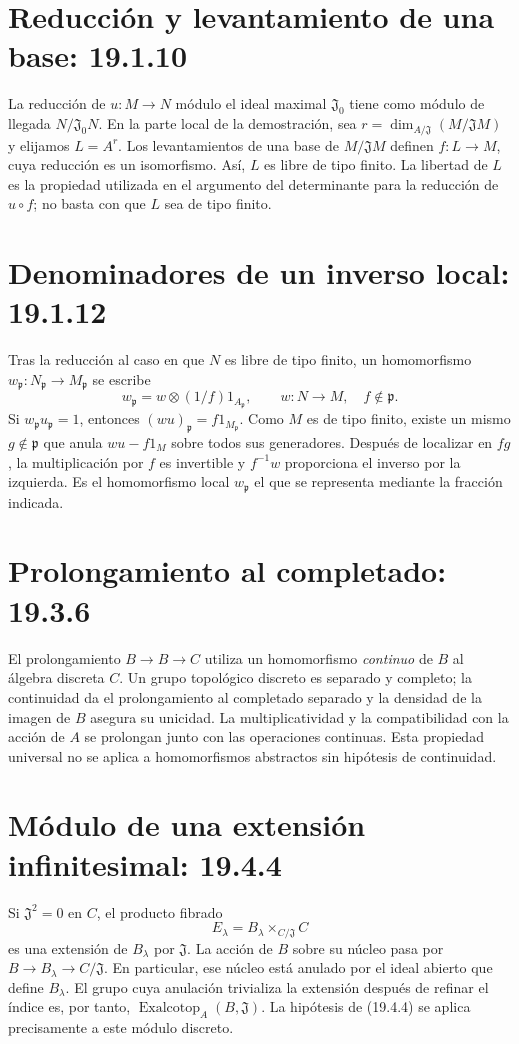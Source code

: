 \documentclass[11pt,a4paper]{article}
\newcommand{\Exalcotop}{\operatorname{Exalcotop}}
\begin{document}
\section*{Reducción y levantamiento de una base: 19.1.10}
La reducción de $u:M\to N$ módulo el ideal maximal $\mathfrak J_0$
tiene como módulo de llegada $N/\mathfrak J_0N$.
En la parte local de la demostración, sea
$r=\dim_{A/\mathfrak J}(M/\mathfrak JM)$ y elijamos $L=A^r$.
Los levantamientos de una base de $M/\mathfrak JM$ definen $f:L\to M$,
cuya reducción es un isomorfismo. Así, $L$ es libre de tipo finito.
La libertad de $L$ es la propiedad utilizada en el argumento del determinante
para la reducción de $u\circ f$; no basta con que $L$ sea de tipo finito.

\section*{Denominadores de un inverso local: 19.1.12}
Tras la reducción al caso en que $N$ es libre de tipo finito, un homomorfismo
$w_{\mathfrak p}:N_{\mathfrak p}\to M_{\mathfrak p}$ se escribe
\[
w_{\mathfrak p}=w\otimes(1/f)1_{A_{\mathfrak p}},
\qquad w:N\to M,\quad f\notin\mathfrak p.
\]
Si $w_{\mathfrak p}u_{\mathfrak p}=1$, entonces
$(wu)_{\mathfrak p}=f1_{M_{\mathfrak p}}$.
Como $M$ es de tipo finito, existe un mismo $g\notin\mathfrak p$ que
anula $wu-f1_M$ sobre todos sus generadores. Después de localizar en $fg$,
la multiplicación por $f$ es invertible y $f^{-1}w$ proporciona el inverso
por la izquierda. Es el homomorfismo local $w_{\mathfrak p}$ el que se
representa mediante la fracción indicada.

\section*{Prolongamiento al completado: 19.3.6}
El prolongamiento $B\to\widehat B\to C$ utiliza un homomorfismo
\emph{continuo} de $B$ al álgebra discreta $C$.
Un grupo topológico discreto es separado y completo; la continuidad da el
prolongamiento al completado separado y la densidad de la imagen de $B$
asegura su unicidad. La multiplicatividad y la compatibilidad con la acción
de $A$ se prolongan junto con las operaciones continuas.
Esta propiedad universal no se aplica a homomorfismos abstractos sin
hipótesis de continuidad.

\section*{Módulo de una extensión infinitesimal: 19.4.4}
Si $\mathfrak J^2=0$ en $C$, el producto fibrado
\[
E_\lambda=B_\lambda\mathbin{\times}_{C/\mathfrak J}C
\]
es una extensión de $B_\lambda$ por $\mathfrak J$.
La acción de $B$ sobre su núcleo pasa por
$B\to B_\lambda\to C/\mathfrak J$. En particular, ese núcleo está
anulado por el ideal abierto que define $B_\lambda$.
El grupo cuya anulación trivializa la extensión después de refinar el índice
es, por tanto, $\Exalcotop_A(B,\mathfrak J)$.
La hipótesis de (19.4.4) se aplica precisamente a este módulo discreto.
\end{document}

